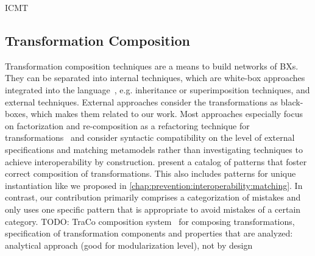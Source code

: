 \begin{copiedFrom}{ICMT}
\subsection*{Transformation Composition}
Transformation composition techniques are a means to build networks of \acp{BX}.
They can be separated into internal techniques, which are white-box approaches integrated into the language~\cite{wagelaar2008a, wagelaar2010a, wagelaar2011a}, e.g. inheritance or superimposition techniques, and external techniques.
External approaches consider the transformations as black-boxes, which makes them related to our work.
Most approaches especially focus on factorization and re-composition as a refactoring technique for transformations~\cite{cuadrado2008a} and consider syntactic compatibility on the level of external specifications and matching metamodels rather than investigating techniques to achieve interoperability by construction.
\textcite{lano2014a} present a catalog of patterns that foster correct composition of transformations.
This also includes patterns for unique instantiation like we proposed in \autoref{chap:prevention:interoperability:matching}.
In contrast, our contribution primarily comprises a categorization of mistakes %
and only uses one specific pattern that is appropriate to avoid mistakes of a certain category. %
TODO: TraCo composition system~\cite{heidenreich2010composition} for composing transformations, specification of transformation components and properties that are analyzed: analytical approach (good for modularization level), not by design




\end{copiedFrom}
